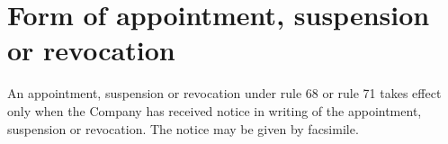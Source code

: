 \section{Form of appointment, suspension or revocation}

An appointment, suspension or revocation under rule 68 or rule 71 takes effect only when the Company has received notice in writing of the appointment, suspension or revocation. The notice may be given by facsimile. 